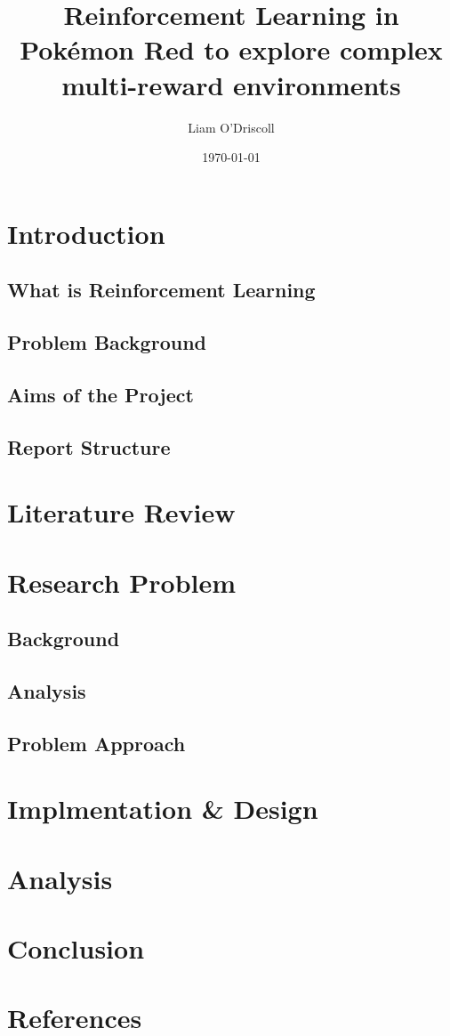 \documentclass{surrey_disso_style}
\title{Reinforcement Learning in Pokémon Red to explore complex multi-reward environments}
\author{Liam O'Driscoll}
\date{\today}
\begin{document}
\maketitle

\section{Introduction}
\subsection{What is Reinforcement Learning}
\subsection{Problem Background}
\subsection{Aims of the Project}
\subsection{Report Structure}

\section{Literature Review}
\section{Research Problem}
\subsection{Background}
\subsection{Analysis}
\subsection{Problem Approach}

\section{Implmentation \& Design}
\section{Analysis}
\section{Conclusion}
\section{References}
\end{document}
